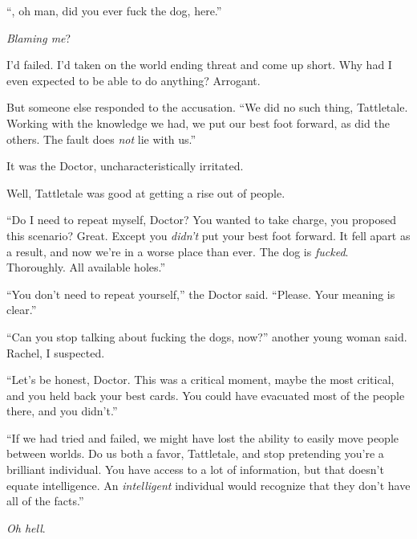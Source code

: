 





``\ldotsMan, oh man, did you ever fuck the dog, here.''



\emph{Blaming me}?



I'd failed.  I'd taken on the world ending threat and come up short.  Why had I even expected to be able to do anything?  Arrogant.



But someone else responded to the accusation.  ``We did no such thing, Tattletale.  Working with the knowledge we had, we put our best foot forward, as did the others.  The fault does \emph{not} lie with us.''



It was the Doctor, uncharacteristically irritated.



Well, Tattletale was good at getting a rise out of people.



``Do I need to repeat myself, Doctor?  You wanted to take charge, you proposed this scenario?  Great.  Except you \emph{didn't} put your best foot forward.  It fell apart as a result, and now we're in a worse place than ever.  The dog is \emph{fucked}.  Thoroughly.  All available holes.''



``You don't need to repeat yourself,'' the Doctor said.  ``Please.  Your meaning is clear.''



``Can you stop talking about fucking the dogs, now?'' another young woman said.  Rachel, I suspected.



``Let's be honest, Doctor.  This was a critical moment, maybe the most critical, and you held back your best cards.  You could have evacuated most of the people there, and you didn't.''



``If we had tried and failed, we might have lost the ability to easily move people between worlds.  Do us both a favor, Tattletale, and stop pretending you're a brilliant individual.  You have access to a lot of information, but that doesn't equate intelligence.  An \emph{intelligent} individual would recognize that they don't have all of the facts.''



\emph{Oh hell}.



